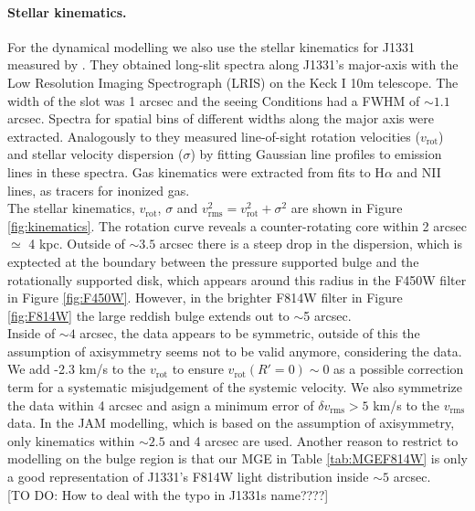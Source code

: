 \paragraph{Stellar kinematics.} For the dynamical modelling we also use the stellar kinematics for J1331 measured by \citet{SWELLSV}. They obtained long-slit spectra along J1331's major-axis with the Low Resolution Imaging Spectrograph (LRIS) on the Keck I 10m telescope. The width of the slot was 1 arcsec and the seeing Conditions had a FWHM of $\sim 1.1$ arcsec. Spectra for spatial bins of different widths along the major axis were extracted. Analogously to \citet{SWELLSII} they measured line-of-sight rotation velocities ($v_\text{rot}$) and stellar velocity dispersion ($\sigma$) by fitting Gaussian line profiles to emission lines in these spectra. Gas kinematics were extracted from fits to H$\alpha$ and NII lines, as tracers for inonized gas.
\\The stellar kinematics, $v_\text{rot}$, $\sigma$ and $v_\text{rms}^2=v_\text{rot}^2 + \sigma^2$ are shown in Figure \ref{fig:kinematics}. The rotation curve reveals a counter-rotating core within 2 arcsec $\simeq$ 4 kpc. Outside of $\sim 3.5$ arcsec there is a steep drop in the dispersion, which is exptected at the boundary between the pressure supported bulge and the rotationally supported disk, which appears around this radius in the F450W filter in Figure \ref{fig:F450W}. However, in the brighter F814W filter in Figure \ref{fig:F814W}  the large reddish bulge extends out to $\sim$5 arcsec. 
\\Inside of $\sim 4$ arcsec, the data appears to be symmetric, outside of this the assumption of axisymmetry seems not to be valid anymore, considering the data. We add -2.3 km/s to the $v_\text{rot}$ to ensure $v_\text{rot}(R'=0) \sim 0$ as a possible correction term for a systematic misjudgement of the systemic velocity. We also symmetrize the data within 4 arcsec and asign a minimum error of $\delta v_\text{rms} > 5$ km/s to the $v_\text{rms}$ data. In the JAM modelling, which is based on the assumption of axisymmetry, only kinematics within $\sim 2.5$ and 4 arcsec are used. Another reason to restrict to modelling on the bulge region is that our MGE in Table \ref{tab:MGEF814W} is only a good representation of J1331's F814W light distribution inside $\sim 5$ arcsec.\\

[TO DO: How to deal with the typo in J1331s name????]